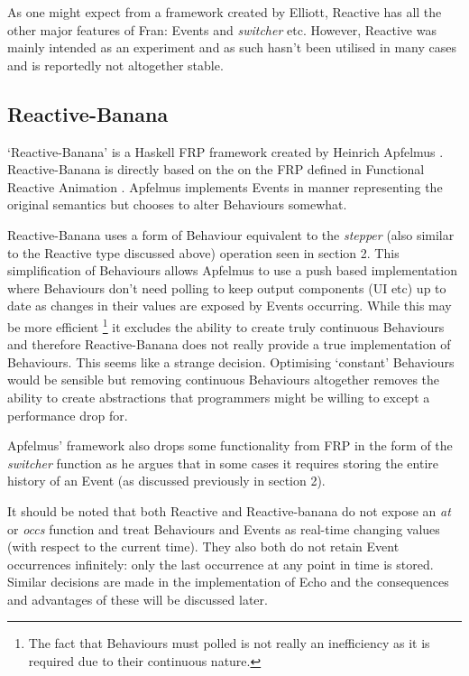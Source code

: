       As one might expect from a framework created by Elliott, Reactive has all the other major features
      of Fran: Events and \emph{switcher} etc. However, Reactive was mainly intended as an experiment
      and as such hasn't been utilised in many cases and is reportedly not altogether stable.
  
    \subsection{Reactive-Banana}
      `Reactive-Banana' is a Haskell FRP framework created by Heinrich Apfelmus \cite{Apfelmus}. Reactive-Banana
      is directly based on the on the FRP defined in Functional Reactive Animation \cite{Elliott1997}. Apfelmus
      implements Events in manner representing the original semantics but chooses to alter
      Behaviours somewhat. 
      
      Reactive-Banana uses a form of Behaviour equivalent to the \emph{stepper}
      (also similar to the Reactive type discussed above) operation seen in section 2. This simplification of Behaviours allows 
      Apfelmus to use a push
      based implementation where Behaviours don't need polling to keep output components (UI etc) up to date as changes in their values are exposed
      by Events occurring. While this may be more efficient \footnote{The fact that Behaviours must polled is not really an inefficiency as it is required due to their continuous nature. } it excludes the ability to create truly 
      continuous Behaviours and therefore Reactive-Banana does not really provide a true implementation
      of Behaviours. This seems like a strange decision. Optimising `constant' Behaviours would be sensible
      but removing continuous Behaviours altogether removes the ability to create abstractions that programmers
      might be willing to except a performance drop for.
      
      Apfelmus' framework also drops some functionality from FRP in the form of the \emph{switcher} function as
      he argues that in some cases it requires storing the entire history of an Event (as discussed previously
      in section 2).
      
    It should be noted that both Reactive and Reactive-banana do not expose an \emph{at} or \emph{occs} function
    and treat Behaviours and Events as real-time changing values (with respect to the current time). They also both do not 
    retain Event 
    occurrences infinitely: only the last occurrence at any point in time is stored. Similar decisions are made in the 
    implementation of Echo and the consequences and advantages of these will be discussed later.


